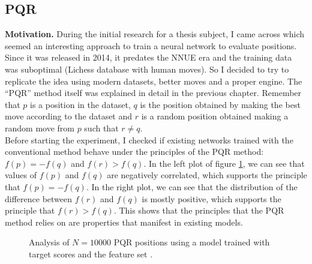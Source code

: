 \newpage
\subsection{PQR}

\textbf{Motivation.} During the initial research for a thesis subject, I came across \cite{dlchess:2014} which seemed an interesting approach to train a neural network to evaluate positions. Since it was released in 2014, it predates the NNUE era and the training data was suboptimal (Lichess database \cite{lichessdb} with human moves). So I decided to try to replicate the idea using modern datasets, better moves and a proper engine. The \enquote{PQR} method itself was explained in detail in the previous chapter.  Remember that $p$ is a position in the dataset, $q$ is the position obtained by making the best move according to the dataset and $r$ is a random position obtained making a random move from $p$ such that $r \neq q$. \\

Before starting the experiment, I checked if existing networks trained with the conventional method behave under the principles of the PQR method: ${f(p) = -f(q)}$ and ${f(r) > f(q)}$. In the left plot of figure \ref{pqr-eval}, we can see that values of $f(p)$ and $f(q)$ are negatively correlated, which supports the principle that $f(p)=-f(q)$. In the right plot, we can see that the distribution of the difference between $f(r)$ and $f(q)$ is mostly positive, which supports the principle that $f(r) > f(q)$. This shows that the principles that the PQR method relies on are properties that manifest in existing models.

\begin{figure}[H]
\centering
{}
\caption{Analysis of $N=10000$ PQR positions using a model trained with target scores and the feature set .}
\label{pqr-eval}
\end{figure}

